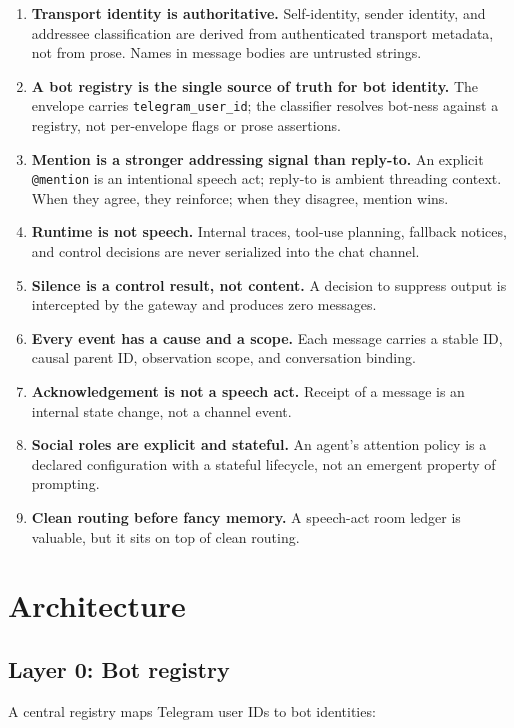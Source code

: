 \documentclass[11pt]{article}
\begin{document}
\begin{enumerate}
\item \textbf{Transport identity is authoritative.}  Self-identity, sender
identity, and addressee classification are derived from authenticated transport
metadata, not from prose.  Names in message bodies are untrusted strings.
\item \textbf{A bot registry is the single source of truth for bot identity.}
The envelope carries \texttt{telegram\_user\_id}; the classifier resolves
bot-ness against a registry, not per-envelope flags or prose assertions.
\item \textbf{Mention is a stronger addressing signal than reply-to.}  An
explicit \texttt{@mention} is an intentional speech act; reply-to is ambient
threading context.  When they agree, they reinforce; when they disagree,
mention wins.
\item \textbf{Runtime is not speech.}  Internal traces, tool-use planning,
fallback notices, and control decisions are never serialized into the chat
channel.
\item \textbf{Silence is a control result, not content.}  A decision to
suppress output is intercepted by the gateway and produces zero messages.
\item \textbf{Every event has a cause and a scope.}  Each message carries a
stable ID, causal parent ID, observation scope, and conversation binding.
\item \textbf{Acknowledgement is not a speech act.}  Receipt of a message is
an internal state change, not a channel event.
\item \textbf{Social roles are explicit and stateful.}  An agent's attention
policy is a declared configuration with a stateful lifecycle, not an emergent
property of prompting.
\item \textbf{Clean routing before fancy memory.}  A speech-act room ledger
is valuable, but it sits on top of clean routing.
\end{enumerate}

\section{Architecture}

\subsection{Layer 0: Bot registry}

A central registry maps Telegram user IDs to bot identities:
\end{document}
